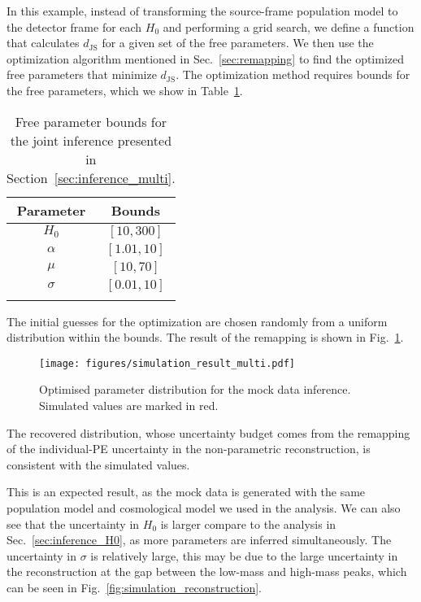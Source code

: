\documentclass[sn-aps, pdflatex, iicol]{sn-jnl}
\begin{document}
In this example, instead of transforming the source-frame population model to the detector frame for each $H_0$ and performing a grid search, we define a function that calculates $d_\mathrm{JS}$ for a given set of the free parameters.
We then use the optimization algorithm mentioned in Sec.~\ref{sec:remapping} to find the optimized free parameters that minimize $d_\mathrm{JS}$.
The optimization method requires bounds for the free parameters, which we show in Table~\ref{tab:bounds}.
\begin{table}[htbp]
    \caption{Free parameter bounds for the joint inference presented in Section~\ref{sec:inference_multi}.}
    \begin{tabular}{cc}
        \toprule
        Parameter & Bounds \\
        \midrule
        $H_0$ & $[10, 300]$ \\
        $\alpha$ & $[1.01, 10]$ \\
        $\mu$ & $[10, 70]$ \\
        $\sigma$ & $[0.01, 10]$ \\
        \botrule
    \end{tabular}
    \label{tab:bounds}
\end{table}
The initial guesses for the optimization are chosen randomly from a uniform distribution within the bounds.
The result of the remapping is shown in Fig.~\ref{fig:simulation_result_multi}.
\begin{figure}
    \texttt{[image: figures/simulation\_result\_multi.pdf]}
    \caption{
        Optimised parameter distribution for the mock data inference. Simulated values are marked in red.
    }
    \label{fig:simulation_result_multi}
\end{figure}
The recovered distribution, whose uncertainty budget comes from the remapping of the individual-\ac{PE} uncertainty in the non-parametric reconstruction, is consistent with the simulated values.

This is an expected result, as the mock data is generated with the same population model and cosmological model we used in the analysis.
We can also see that the uncertainty in $H_0$ is larger compare to the analysis in Sec.~\ref{sec:inference_H0}, as more parameters are inferred simultaneously.
The uncertainty in $\sigma$ is relatively large, this may be due to the large uncertainty in the reconstruction at the gap between the low-mass and high-mass peaks, which can be seen in 
Fig.~\ref{fig:simulation_reconstruction}.
\end{document}
